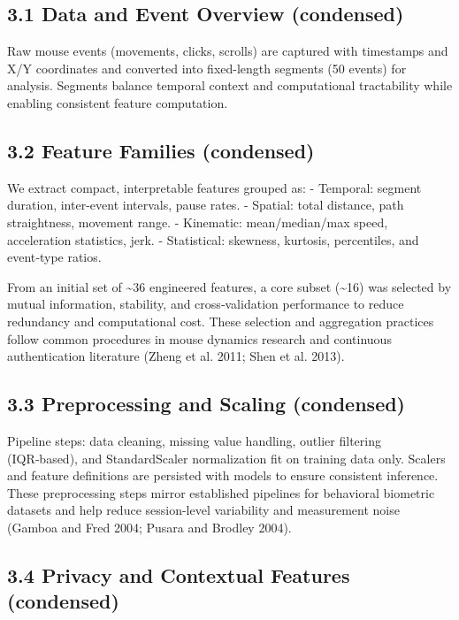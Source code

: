 \documentclass[
  11pt,
  a4paper,
]{article}
\begin{document}
\newpage

\subsection{3.1 Data and Event Overview
(condensed)}\label{data-and-event-overview-condensed}

Raw mouse events (movements, clicks, scrolls) are captured with
timestamps and X/Y coordinates and converted into fixed-length segments
(50 events) for analysis. Segments balance temporal context and
computational tractability while enabling consistent feature
computation.

\subsection{3.2 Feature Families
(condensed)}\label{feature-families-condensed}

We extract compact, interpretable features grouped as: - Temporal:
segment duration, inter-event intervals, pause rates. - Spatial: total
distance, path straightness, movement range. - Kinematic:
mean/median/max speed, acceleration statistics, jerk. - Statistical:
skewness, kurtosis, percentiles, and event‑type ratios.

From an initial set of \textasciitilde36 engineered features, a core
subset (\textasciitilde16) was selected by mutual information,
stability, and cross‑validation performance to reduce redundancy and
computational cost. These selection and aggregation practices follow
common procedures in mouse dynamics research and continuous
authentication literature (Zheng et al. 2011; Shen et al. 2013).

\subsection{3.3 Preprocessing and Scaling
(condensed)}\label{preprocessing-and-scaling-condensed}

Pipeline steps: data cleaning, missing value handling, outlier filtering
(IQR‑based), and StandardScaler normalization fit on training data only.
Scalers and feature definitions are persisted with models to ensure
consistent inference. These preprocessing steps mirror established
pipelines for behavioral biometric datasets and help reduce
session-level variability and measurement noise (Gamboa and Fred 2004;
Pusara and Brodley 2004).

\subsection{3.4 Privacy and Contextual Features
(condensed)}\label{privacy-and-contextual-features-condensed}
\end{document}
